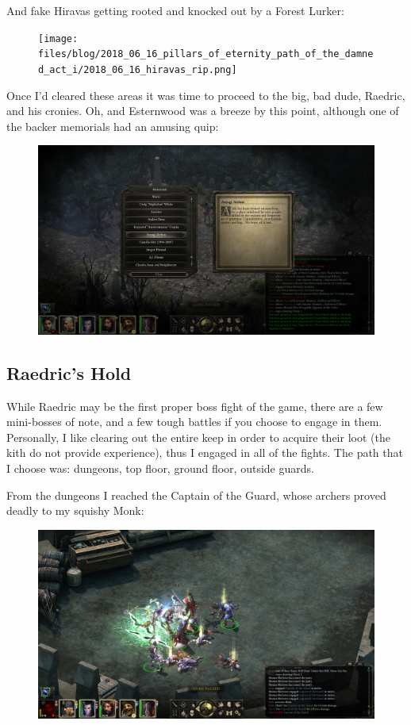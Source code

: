 \documentclass{article}
\begin{document}
And fake Hiravas getting rooted and knocked out by a Forest Lurker:

\begin{figure}
\texttt{[image: files/blog/2018\_06\_16\_pillars\_of\_eternity\_path\_of\_the\_damned\_act\_i/2018\_06\_16\_hiravas\_rip.png]}
\end{figure}

Once I'd cleared these areas it was time to proceed to the big, bad dude, Raedric, and his cronies.  Oh, and Esternwood was a breeze by this point, although one of the backer memorials had an amusing quip:

\begin{figure}
\includegraphics[scale=0.33]{files/blog/2018_06_16_pillars_of_eternity_path_of_the_damned_act_i/2018_06_16_grammar.jpg}
\end{figure}

\subsection{Raedric's Hold}
While Raedric may be the first proper boss fight of the game, there are a few mini-bosses of note, and a few tough battles if you choose to engage in them.  Personally, I like clearing out the entire keep in order to acquire their loot (the kith do not provide experience), thus I engaged in all of the fights.  The path that I choose was: dungeons, top floor, ground floor, outside guards.

From the dungeons I reached the Captain of the Guard, whose archers proved deadly to my squishy Monk:

\begin{figure}
\includegraphics[scale=0.33]{files/blog/2018_06_16_pillars_of_eternity_path_of_the_damned_act_i/2018_06_16_captain_of_the_guard.jpg}
\end{figure}
\end{document}

